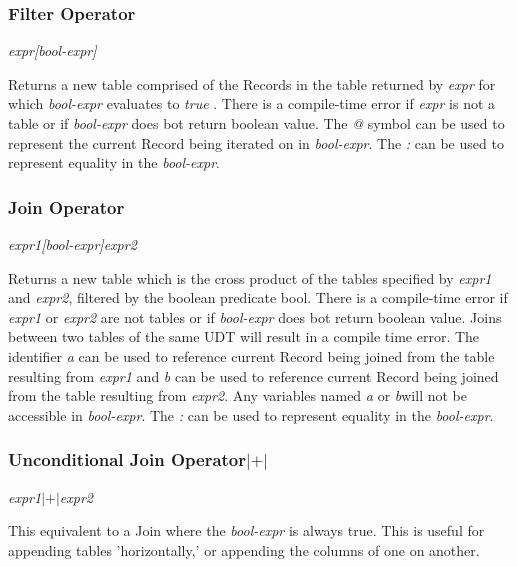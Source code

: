 \subsubsection{Filter Operator}
\begin{center}
\textsl{expr[bool-expr]}
\end{center}
Returns a new table comprised of the Records in the table returned by \textsl{expr} for which 
\textsl{bool-expr} evaluates to \textsl{true} . There is a compile-time error if \textsl{expr} is not a table
or if \textsl{bool-expr} does bot return boolean value. The \textsl{@} symbol can be used to represent the current
Record being iterated on in \textsl{bool-expr}. The \textsl{:} can be used to represent equality in the \textsl{bool-expr}.

\subsubsection{Join Operator}
\begin{center}
\textsl{expr1[bool-expr]expr2}
\end{center}
Returns a new table which is the cross product of the tables specified by \textsl{expr1}
and \textsl{expr2}, filtered by the boolean predicate bool. There is a compile-time error if \textsl{expr1} 
or \textsl{expr2} are not tables or if \textsl{bool-expr} does bot return boolean value. Joins between two tables
of the same UDT will result in a compile time error. The identifier \textsl{a} can be used to reference current
Record being joined from the table resulting from \textsl{expr1} and \textsl{b} can be used to reference current
Record being joined from the table resulting from \textsl{expr2}. Any variables named \textsl{a} or \textsl{b}will
not be accessible in \textsl{bool-expr}. The \textsl{:} can be used to represent equality in the \textsl{bool-expr}.

\subsubsection{Unconditional Join Operator$|+|$}
\begin{center}
\textsl{expr1$|+|$expr2}
\end{center}
This equivalent to a Join where the \textsl{bool-expr} is always true.  This is useful for appending tables 'horizontally,'
or appending the columns of one on another.

